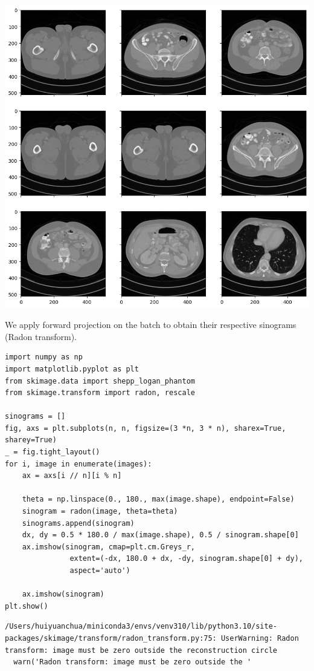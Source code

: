 \documentclass[a4paper, 11pt]{article}
\begin{document}
\begin{center}
\includegraphics[width=.9\linewidth]{./.ob-jupyter/02c449134c0f8da25e8477bf7d63a68818d480db.png}
\end{center}


We apply forward projection on the batch to obtain their respective sinograms (Radon transform).
\begin{verbatim}
import numpy as np
import matplotlib.pyplot as plt
from skimage.data import shepp_logan_phantom
from skimage.transform import radon, rescale

sinograms = []
fig, axs = plt.subplots(n, n, figsize=(3 *n, 3 * n), sharex=True, sharey=True)
_ = fig.tight_layout()
for i, image in enumerate(images):
    ax = axs[i // n][i % n]

    theta = np.linspace(0., 180., max(image.shape), endpoint=False)
    sinogram = radon(image, theta=theta)
    sinograms.append(sinogram)
    dx, dy = 0.5 * 180.0 / max(image.shape), 0.5 / sinogram.shape[0]
    ax.imshow(sinogram, cmap=plt.cm.Greys_r,
               extent=(-dx, 180.0 + dx, -dy, sinogram.shape[0] + dy),
               aspect='auto')

    ax.imshow(sinogram)
plt.show()
\end{verbatim}

\begin{verbatim}
/Users/huiyuanchua/miniconda3/envs/venv310/lib/python3.10/site-packages/skimage/transform/radon_transform.py:75: UserWarning: Radon transform: image must be zero outside the reconstruction circle
  warn('Radon transform: image must be zero outside the '
\end{verbatim}
\end{document}
